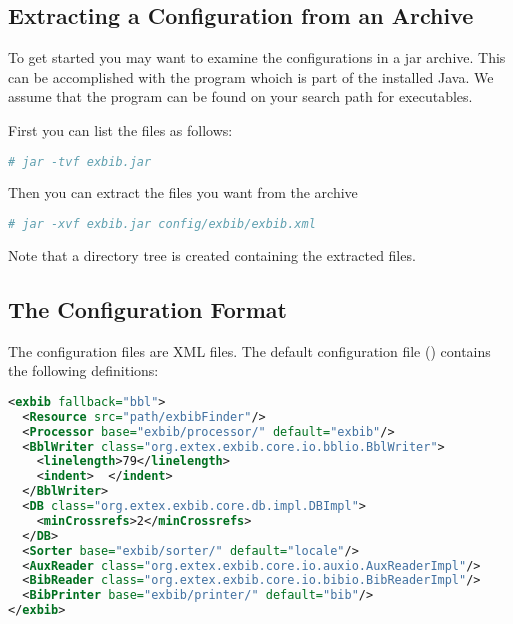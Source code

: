 \subsection{Extracting a Configuration from an Archive}

To get started you may want to examine the configurations in a jar
archive. This can be accomplished with the program  whoich
is part of the installed Java. We assume that the program can be found
on your search path for executables.

First you can list the files as follows:
\begin{lstlisting}[language=sh]
  # jar -tvf exbib.jar
\end{lstlisting}

Then you can extract the files you want from the archive
\begin{lstlisting}[language=sh]
  # jar -xvf exbib.jar config/exbib/exbib.xml
\end{lstlisting}

Note that a directory tree is created containing the extracted files.


\subsection{The Configuration Format}

The configuration files are XML files. The default configuration file
() contains the following definitions:

\begin{lstlisting}[language=XML]
<exbib fallback="bbl">
  <Resource src="path/exbibFinder"/>
  <Processor base="exbib/processor/" default="exbib"/>
  <BblWriter class="org.extex.exbib.core.io.bblio.BblWriter">
    <linelength>79</linelength>
    <indent>  </indent>
  </BblWriter>
  <DB class="org.extex.exbib.core.db.impl.DBImpl">
    <minCrossrefs>2</minCrossrefs>
  </DB>
  <Sorter base="exbib/sorter/" default="locale"/>
  <AuxReader class="org.extex.exbib.core.io.auxio.AuxReaderImpl"/>
  <BibReader class="org.extex.exbib.core.io.bibio.BibReaderImpl"/>
  <BibPrinter base="exbib/printer/" default="bib"/>
</exbib>
\end{lstlisting}


\INCOMPLETE


\endinput
%
